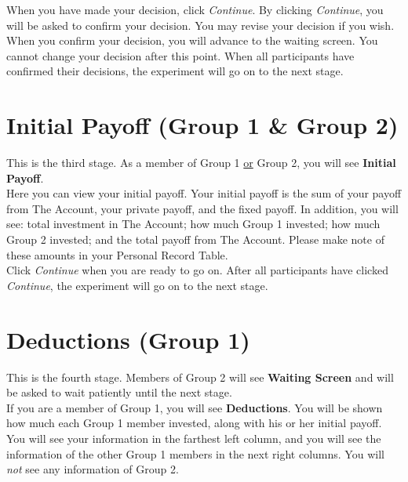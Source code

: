 \documentclass[12pt]{article}
\begin{document}
When you have made your decision, click {\em Continue}.  By clicking {\em Continue}, you will be asked to confirm your decision.  You may revise your decision if you wish.  When you confirm your decision, you will advance to the waiting screen.  You cannot change your decision after this point. When all participants have confirmed their decisions, the experiment will go on to the next stage. \\ 



\section{Initial Payoff (Group 1 \& Group 2)}

This is the third stage. As a member of Group 1  \underline{or} Group 2, you will see {\bf Initial Payoff}.\\

Here you can view your initial payoff.  Your initial payoff is the sum of your payoff from The Account, your private payoff, and the fixed payoff. In addition, you will see: total investment in The Account; how much Group 1 invested; how much Group 2 invested; and the total payoff from The Account. Please make note of these amounts in your Personal Record Table.\\

Click {\em Continue} when you are ready to go on.  After all participants have clicked {\em Continue}, the experiment will go on to the next stage.\\  



\section{Deductions (Group 1)}

This is the fourth stage. Members of Group 2 will see {\bf Waiting Screen} and will be asked to wait patiently until the next stage.\\   

If you are a member of Group 1, you will see {\bf Deductions}. You will be shown how much each Group 1 member invested, along with his or her initial payoff. You will see your information in the farthest left column, and you will see the information of the other Group 1 members in the next right columns. You will {\em not} see any information of Group 2.\\
\end{document}
